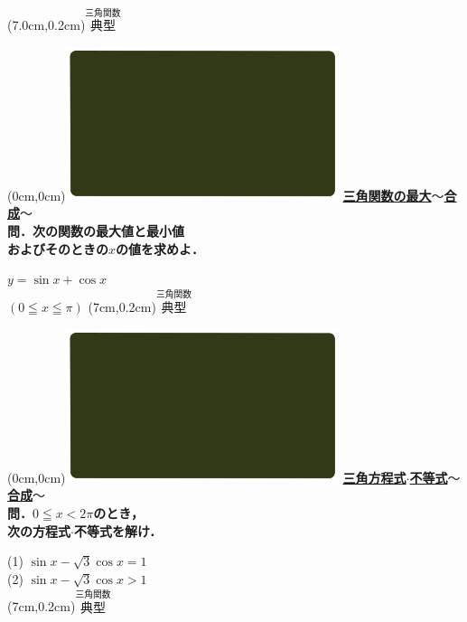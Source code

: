 \documentclass[10pt,
fleqn,
dvipdfmx,
uplatex
]{jsarticle}
\begin{document}
\at(7.0cm,0.2cm){\small\color{bradorange}$\overset{\text{三角関数}}{\text{典型}}$}


\newpage

\at(0cm,0cm){\includegraphics[width=8cm,bb=0 0 1920 1080]{./youtube/thumbnails/templates/smart_background/三角関数.jpeg}}
{\color{orange}\bf\boldmath\Large\underline{三角関数の最大$〜$合成$〜$}}\vspace{0.3zw}\\
\large 
\bf\boldmath 問．次の関数の最大値と最小値\\
\hfill およびそのときの$x$の値を求めよ．

\huge
\hspace{0.2zw} $y=\sin x+\cos x$\\ 
\hfill $\left(0\leqq x\leqq \pi \right)$
\at(7cm,0.2cm){\small\color{bradorange}$\overset{\text{三角関数}}{\text{典型}}$}

\newpage

\at(0cm,0cm){\includegraphics[width=8cm,bb=0 0 1920 1080]{./youtube/thumbnails/templates/smart_background/三角関数.jpeg}}
{\color{orange}\bf\boldmath\Large\underline{三角方程式$\cdot$不等式$〜$合成$〜$}}\vspace{0.3zw}\\
\large
\bf\boldmath 問．$0\leqq x<2\pi$のとき，\\
\hfill 次の方程式$\cdot$不等式を解け．

\LARGE
(1)  $\sin x-\sqrt 3\cos x=1$\\
(2)  $\sin x-\sqrt 3\cos x>1$\\

\at(7cm,0.2cm){\small\color{bradorange}$\overset{\text{三角関数}}{\text{典型}}$}
\end{document}
